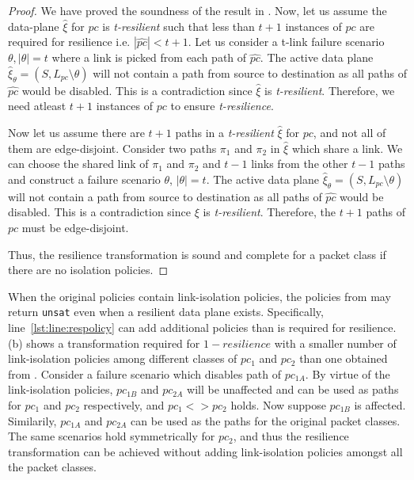 \iffull
	\begin{proof}
		We have proved the soundness of the result in . 
		Now, let us assume the data-plane $\hat{\xi}$ for $pc$ is \emph{t-resilient} such 
		that less than $t+1$ instances of $pc$ are required for resilience i.e. 
		$|\hat{pc}| < t+1$. Let us consider a 
		t-link failure scenario $\theta, |\theta| = t$ where a link is picked from
		each path of $\hat{pc}$. The active data plane
		$\hat{\xi}_\theta = (S, L_{pc} \setminus \theta)$ will not contain a
		path from source to destination as all paths of $\hat{pc}$ would be disabled.  
		This is a contradiction since $\hat{\xi}$ is \emph{t-resilient}. 
		Therefore, we need atleast $t+1$ instances of $pc$ to ensure \emph{t-resilience}.
		
		Now let us assume there are $t+1$ paths in a \emph{t-resilient} $\hat{\xi}$ for $pc$,
		and not all of them are edge-disjoint. Consider two paths $\pi_1$ and $\pi_2$
		in $\hat{\xi}$ which share a link. We can choose the shared link 
		of $\pi_1$ and $\pi_2$ and $t-1$ links from the other $t-1$ paths 
		and construct a failure scenario $\theta$, $|\theta| = t$.
		The active data plane
		$\hat{\xi}_\theta = (S, L_{pc} \setminus \theta)$ will not contain a
		path from source to destination as all paths of $\hat{pc}$ would be disabled.  
		This is a contradiction since $\xi$ is \emph{t-resilient}. Therefore,
		the $t+1$ paths of $pc$ must be edge-disjoint. 
		
		\noindent Thus, the resilience transformation is sound and complete for a  
		packet class if there are no isolation policies.
	\end{proof}
\fi

When the original policies contain link-isolation policies, the policies
from  may return \texttt{unsat} even when a
resilient data plane exists. Specifically, line~\ref{lst:line:respolicy}
can add additional policies than is required for resilience.
 (b) shows a transformation required for $1-resilience$ 
 with a smaller number of link-isolation policies among different classes
 of $pc_1$ and $pc_2$ than one obtained from . 
 Consider a failure scenario which disables path
 of $pc_{1A}$. By virtue of the link-isolation policies, $pc_{1B}$ and
 $pc_{2A}$ will be unaffected and can be used as paths for $pc_1$ 
 and $pc_2$ respectively, and $pc_1 <> pc_2$ holds. Now suppose
 $pc_{1B}$ is affected. Similarily, $pc_{1A}$ and $pc_{2A}$ can be used as
 the paths for the original packet classes. The same scenarios hold symmetrically
 for $pc_2$, and thus the resilience transformation can be achieved without
 adding link-isolation policies amongst all the packet classes. 
 
